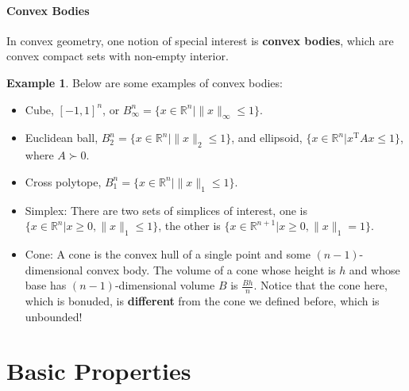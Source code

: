 \documentclass[openany]{book}
\theoremstyle{definition}
\newtheorem{example}{Example}[chapter]
\theoremstyle{remark}
\begin{document}
\paragraph{Convex Bodies}
In convex geometry, one notion of special interest is \textbf{convex bodies}, which are convex compact sets with non-empty interior.
\begin{example}
    Below are some examples of convex bodies:
    \begin{itemize}
        \item Cube, $[-1,1]^n$, or $B^n_{\infty}=\{x\in \mathbb{R}^n|\|x\|_{\infty}\le1\}$.
        \item Euclidean ball, $B^n_2=\{x\in \mathbb{R}^n|\|x\|_2\le1\}$, and ellipsoid, $\{x\in \mathbb{R}^n|x^{\mathrm{T}}Ax\le1\}$, where $A\succ0$.
        \item Cross polytope, $B^n_1=\{x\in \mathbb{R}^n|\|x\|_1\le1\}$.
        \item Simplex: There are two sets of simplices of interest, one is $\{x\in \mathbb{R}^n|x\ge0,\|x\|_1\le1\}$, the other is $\{x\in \mathbb{R}^{n+1}|x\ge0,\|x\|_1=1\}$.
        \item Cone: A cone is the convex hull of a single point and some $(n-1)$-dimensional convex body. The volume of a cone whose height is $h$ and whose base has $(n-1)$-dimensional volume $B$ is $\frac{Bh}{n}$. Notice that the cone here, which is bonuded, is \textbf{different} from the cone we defined before, which is unbounded!
    \end{itemize}
\end{example}

\section{Basic Properties}
\end{document}

